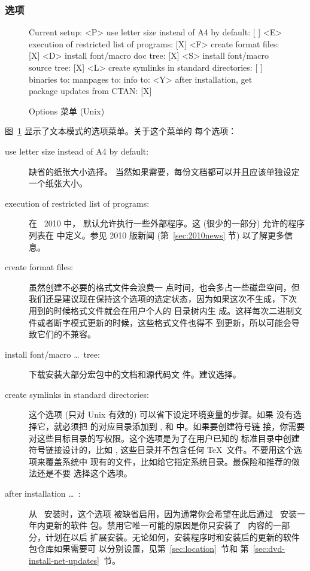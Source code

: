 \documentclass{article}
\begin{document}
\subsubsection{选项}
\label{sec:options}

\begin{figure}[tbh]
\begin{boxedverbatim}
Current setup:
 <P> use letter size instead of A4 by default: [ ]
 <E> execution of restricted list of programs: [X]
 <F> create format files:                      [X]
 <D> install font/macro doc tree:              [X]
 <S> install font/macro source tree:           [X]
 <L> create symlinks in standard directories:  [ ]
            binaries to:
            manpages to:
                info to:
 <Y> after installation, get package updates from CTAN: [X]
\end{boxedverbatim}
\caption{Options 菜单 (Unix)}\label{fig:options-text}
\end{figure}

图~\ref{fig:options-text} 显示了文本模式的选项菜单。关于这个菜单的
每个选项：

\begin{description}
\item[use letter size instead of A4 by default:] 缺省的纸张大小选择。
当然如果需要，每份文档都可以并且应该单独设定一个纸张大小。

\item[execution of restricted list of programs:] 在 \TL\ 2010 中，
默认允许执行一些外部程序。这 (很少的一部分) 允许的程序列表在
 中定义。参见 2010 版新闻 (第~\ref{sec:2010news} 节)
以了解更多信息。

\item[create format files:] 虽然创建不必要的格式文件会浪费一
点时间，也会多占一些磁盘空间，但
我们还是建议现在保持这个选项的选定状态，因为如果这次不生成，下次
用到的时候格式文件就会在用户个人的  目录树内生
成。这样每次二进制文件或者断字模式更新的时候，这些格式文件也得不
到更新，所以可能会导致它们的不兼容。

\item[install font/macro \ldots\ tree:] 下载安装大部分宏包中的文档和源代码文
件。建议选择。

\item[create symlinks in standard directories:]
这个选项 (只对 Unix 有效的) 可以省下设定环境变量的步骤。如果
没有选择它，就必须把 \TL{} 的对应目录添加到 ,
 和  中。如果要创建符号链
接，你需要对这些目标目录的写权限。这个选项是为了在用户已知的
标准目录中创建符号链接设计的，比如 ,
这些目录并不包含任何 \TeX\ 文件。不要用这个选项来覆盖系统中
现有的文件，比如给它指定系统目录。最保险和推荐的做法还是不要
选择这个选项。

\item[after installation \ldots\ \CTAN:] 从 \DVD\ 安装时，这个选项
被缺省启用，因为通常你会希望在此后通过 \CTAN\ 安装一年内更新的软件
包。禁用它唯一可能的原因是你只安装了 \DVD\ 内容的一部分，计划在以后
扩展安装。无论如何，安装程序时和安装后的更新的软件包仓库如果需要可
以分别设置，见第~\ref{sec:location}~节和
第~\ref{sec:dvd-install-net-updates}~节。
\end{description}
\end{document}
